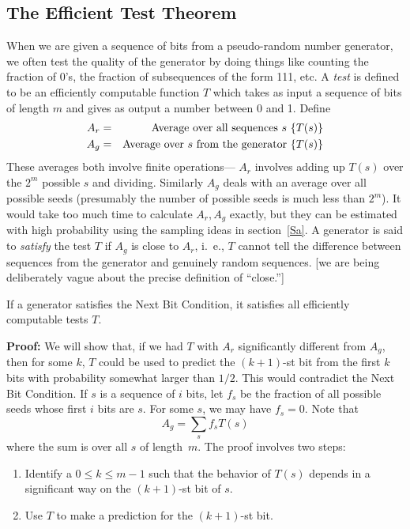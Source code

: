 \subsection{The Efficient Test Theorem}
When we are given a sequence of bits from a pseudo-random number generator,
we often test the quality of the generator by doing things like counting
the fraction of 0's, the fraction of subsequences of the form 111, etc.
\pq A {\it test\/} is defined to be an efficiently computable function
$T$ which takes as input a sequence of bits of length $m$ 
and gives as output a number between 0 and 1.  Define
\begin{eqnarray*}A_r&=&\hbox{Average over all sequences $s$ }\{T(s)\}\\
A_g&=&\hbox{Average over $s$ from the generator }\{T(s)\}\end{eqnarray*}
These averages both involve finite operations--- $A_r$ involves adding
up $T(s)$ over the $2^m$ possible $s$ and dividing.  Similarly $A_g$
deals with an average over all possible seeds (presumably the number of
possible seeds is much less than $2^m$).
\pq It would take too much time to calculate $A_r,A_g$ exactly, but they
can be estimated with high probability using the sampling ideas in
section~\ref{Sa}.
\pq A generator is said to {\it satisfy\/} the test $T$ if $A_g$ is close
to $A_r$, i.~e., $T$ cannot tell the difference between sequences from
the generator and genuinely random sequences. [we are being deliberately
vague about the precise definition of ``close.'']
\begin{Th} If a generator satisfies the Next Bit Condition, it satisfies all
efficiently computable tests $T$.\end{Th}
{\bf Proof:} We will show that, if we had $T$ with $A_r$ significantly
different from $A_g$, then for some $k$, $T$ could be used to predict
the $(k+1)$-st bit from the first $k$ bits with probability somewhat
larger than $1/2$. This would contradict the Next Bit Condition.
\pq If $s$ is a sequence of $i$ bits, let $f_s$ be the fraction of all
possible seeds whose first $i$ bits are $s$.  For some $s$, we may have
$f_s=0$.  Note that$$A_g=\sum_sf_sT(s)$$where the sum is over all $s$ of
length~$m$.\pq
The proof involves two steps:\begin{enumerate}\item Identify a $0\le
k\le m-1$ such that the behavior of $T(s)$ depends in a significant way
on the $(k+1)$-st bit of $s$.\item Use $T$ to make a prediction for
the $(k+1)$-st bit.\end{enumerate}
